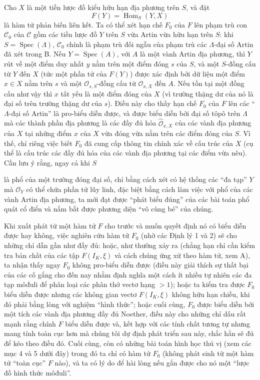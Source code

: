 \documentclass[11pt,twoside,openany]{book}
\numberwithin{equation}{section}
\newcommand{\src}[1]{%
  \phantomsection\hypertarget{src:\fgasourceid:#1}{}%
  \marginpar{\raggedleft\footnotesize\sffamily #1}%
}
\newcommand{\fgasourceid}{unset}
\begin{document}
Cho $X$ là một tiền lược đồ kiểu hữu hạn địa phương trên $S$, và đặt
\[
  F(Y)=\operatorname{Hom}_S(Y,X)
\]
là hàm tử phản biến liên kết. Ta có thể xét hạn chế $F_0$ của $F$ lên phạm trù
con $\mathcal C_0$ của $\mathcal C$ gồm các tiền lược đồ $Y$ trên $S$ vừa
Artin vừa hữu hạn trên $S$: khi $S=\operatorname{Spec}(\Lambda)$,
$\mathcal C_0$ chính là phạm trù đối ngẫu của phạm trù các $\Lambda$-đại số
Artin đã xét trong B. Nếu $Y=\operatorname{Spec}(A)$, với $A$ là một vành
Artin địa phương, thì $Y$ rút về một điểm duy nhất $y$ nằm trên một điểm đóng
$s$ của $S$, và một $S$-đồng cấu từ $Y$ đến $X$ (tức một phần tử của $F(Y)$)
được xác định bởi dữ liệu một điểm $x\in X$ nằm trên $s$ và một
$\mathcal O_{s,S}$-đồng cấu từ $\mathcal O_{x,X}$ đến $A$. Nếu tồn tại một
đồng cấu như vậy thì $x$ tất yếu là một điểm đóng của $X$ (vì trường thặng dư
của nó là đại số trên trường thặng dư của $s$). Điều này cho thấy hạn chế
$F_0$ của $F$ lên các ``$\Lambda$-đại số Artin'' là pro-biểu diễn được, và
được biểu diễn bởi đại số tôpô trên $\Lambda$ mà các thành phần địa phương là
các đầy đủ hóa $\widehat{\mathcal O}_{x,X}$ của các vành địa phương của $X$
tại những điểm $x$ của $X$ vừa đóng vừa nằm trên các điểm đóng của $S$. Vì
thế, chỉ riêng việc biết $F_0$ đã cung cấp thông tin chính xác về cấu trúc của
$X$ (cụ thể là cấu trúc các đầy đủ hóa của các vành địa phương tại các điểm
vừa nêu). Cần lưu ý rằng, ngay cả khi $S$

\src{380}
là phổ của một trường đóng đại số, chỉ bằng cách xét có hệ thống các ``đa
tạp'' $Y$ mà $\mathcal O_Y$ có thể chứa phần tử lũy linh, đặc biệt bằng cách
làm việc với phổ của các vành Artin địa phương, ta mới đạt được ``phát biểu
đúng'' của các bài toán phổ quát cổ điển và nắm bắt được phương diện ``vô cùng
bé'' của chúng.

Khi xuất phát từ một hàm tử $F$ cho trước và muốn quyết định nó có biểu diễn
được hay không, việc nghiên cứu hàm tử $F_0$ (nhờ các Định lý 1 và 2) sẽ cho
những chỉ dẫn gần như đầy đủ: hoặc, như thường xảy ra (chẳng hạn chỉ cần kiểm
tra bản chất của các tập $F(I_K,\xi)$ và cách chúng ứng xử theo hàm tử, xem A),
ta nhận thấy ngay $F_0$ không pro-biểu diễn được (điều này giải thích sự thất
bại của các cố gắng cho đến nay nhằm định nghĩa một cách ít nhiều tự nhiên
các đa tạp môđuli để phân loại các phân thớ vectơ hạng $>1$); hoặc ta kiểm tra
được $F_0$ biểu diễn được nhưng các không gian vectơ $F(I_K,\xi)$ không hữu
hạn chiều, khi đó phải bằng lòng với nghiệm ``hình thức''; hoặc cuối cùng,
$F_0$ được biểu diễn bởi một tích các vành địa phương đầy đủ Noether, điều này
cho những chỉ dấu rất mạnh rằng chính $F$ biểu diễn được và, kết hợp với các
tính chất tương tự nhưng mang tính toàn cục hơn mà chúng tôi dự định phát
triển sau này, chắc hẳn sẽ đủ để kéo theo điều đó. Cuối cùng, còn có những bài
toán hình học thú vị (xem các mục 4 và 5 dưới đây) trong đó ta chỉ có hàm tử
$F_0$ (không phát sinh từ một hàm tử ``toàn cục'' $F$ nào), và ta có lý do để
hài lòng nếu gắn được cho nó một ``lược đồ hình thức môđuli''.
\end{document}

